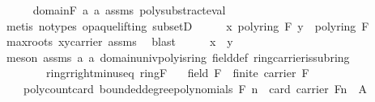 \begin{isabellebody}
\ \ \ \ \isamarkupfalse%
\ domain{\isacharunderscore}{\kern0pt}F\ a{}\ a{}\ assms{\isacharparenleft}{\kern0pt}{}{\isacharparenright}{\kern0pt}\ poly{\isacharunderscore}{\kern0pt}substract{\isacharunderscore}{\kern0pt}eval\ \isamarkupfalse%
\ {\isacharparenleft}{\kern0pt}metis\ {\isacharparenleft}{\kern0pt}no{\isacharunderscore}{\kern0pt}types{\isacharcomma}{\kern0pt}\ opaque{\isacharunderscore}{\kern0pt}lifting{\isacharparenright}{\kern0pt}\ subsetD{\isacharparenright}{\kern0pt}\isanewline
\ \ \isamarkupfalse%
\ \isamarkupfalse%
\ {\isachardoublequoteopen}x\ {\isasymominus}\isactrlbsub poly{\isacharunderscore}{\kern0pt}ring\ F\isactrlesub \ y\ {\isacharequal}{\kern0pt}\ {\isasymzero}\isactrlbsub poly{\isacharunderscore}{\kern0pt}ring\ F\isactrlesub {\isachardoublequoteclose}\isanewline
\ \ \ \ \isamarkupfalse%
\ max{\isacharunderscore}{\kern0pt}roots\ x{\isacharunderscore}{\kern0pt}y{\isacharunderscore}{\kern0pt}carrier\ assms\ \isamarkupfalse%
\ blast\isanewline
\ \ \isamarkupfalse%
\ \isamarkupfalse%
\ {\isachardoublequoteopen}x\ {\isacharequal}{\kern0pt}\ y{\isachardoublequoteclose}\isanewline
\ \ \ \ \isamarkupfalse%
\ {\isacharparenleft}{\kern0pt}meson\ assms{\isacharparenleft}{\kern0pt}{}{\isacharparenright}{\kern0pt}\ a{}\ a{}\ domain{\isachardot}{\kern0pt}univ{\isacharunderscore}{\kern0pt}poly{\isacharunderscore}{\kern0pt}is{\isacharunderscore}{\kern0pt}ring\ field{\isacharunderscore}{\kern0pt}def\ ring{\isachardot}{\kern0pt}carrier{\isacharunderscore}{\kern0pt}is{\isacharunderscore}{\kern0pt}subring\ \isanewline
\ \ \ \ \ \ \ \ ring{\isachardot}{\kern0pt}r{\isacharunderscore}{\kern0pt}right{\isacharunderscore}{\kern0pt}minus{\isacharunderscore}{\kern0pt}eq\ ring{\isacharunderscore}{\kern0pt}F{\isacharparenright}{\kern0pt}\isanewline
{}\isamarkupfalse%
%
\endisatagproof
{\isafoldproof}%
%
\isadelimproof
\isanewline
%
\endisadelimproof
\isanewline
{}\isamarkupfalse%
\isanewline
\ \ \ {\isachardoublequoteopen}field\ F\ {\isasymand}\ finite\ {\isacharparenleft}{\kern0pt}carrier\ F{\isacharparenright}{\kern0pt}{\isachardoublequoteclose}\isanewline
\ \ \ \isanewline
\ \ \ \ poly{\isacharunderscore}{\kern0pt}count{\isacharcolon}{\kern0pt}{\isachardoublequoteopen}card\ {\isacharparenleft}{\kern0pt}bounded{\isacharunderscore}{\kern0pt}degree{\isacharunderscore}{\kern0pt}polynomials\ F\ n{\isacharparenright}{\kern0pt}\ {\isacharequal}{\kern0pt}\ card\ {\isacharparenleft}{\kern0pt}carrier\ F{\isacharparenright}{\kern0pt}{\isacharcircum}{\kern0pt}n{\isachardoublequoteclose}\ {\isacharparenleft}{\kern0pt}\ {\isacharquery}{\kern0pt}A{\isacharparenright}{\kern0pt}\ \isanewline

\end{isabellebody}
